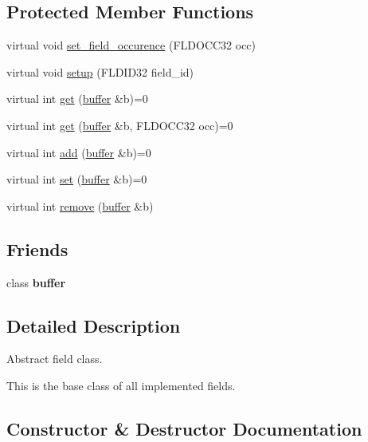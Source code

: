 \subsection*{Protected Member Functions}
\begin{DoxyCompactItemize}
\item 
virtual void \hyperlink{classatmi_1_1field_a83412cd9df383c342b5feb195090c9d9}{set\+\_\+field\+\_\+occurence} (F\+L\+D\+O\+C\+C32 occ)
\item 
virtual void \hyperlink{classatmi_1_1field_a9ca5e61e3e1068770098d20ad1332f24}{setup} (F\+L\+D\+I\+D32 field\+\_\+id)
\item 
virtual int \hyperlink{classatmi_1_1field_aae2d3df756e816b5db8f729039a59a51}{get} (\hyperlink{classatmi_1_1buffer}{buffer} \&b)=0
\item 
virtual int \hyperlink{classatmi_1_1field_a56ce53fabe290b94463f87936515ec46}{get} (\hyperlink{classatmi_1_1buffer}{buffer} \&b, F\+L\+D\+O\+C\+C32 occ)=0
\item 
virtual int \hyperlink{classatmi_1_1field_a5441bc87ba4bc3e9eb37c6db6a29688f}{add} (\hyperlink{classatmi_1_1buffer}{buffer} \&b)=0
\item 
virtual int \hyperlink{classatmi_1_1field_a41bb209965d627d2e67c839bece5372c}{set} (\hyperlink{classatmi_1_1buffer}{buffer} \&b)=0
\item 
virtual int \hyperlink{classatmi_1_1field_a783484fe641f66f5773f9eed7fd4be39}{remove} (\hyperlink{classatmi_1_1buffer}{buffer} \&b)
\end{DoxyCompactItemize}
\subsection*{Friends}
\begin{DoxyCompactItemize}
\item 
class {\bfseries buffer}\hypertarget{classatmi_1_1field_afecbc2840248040e50fecb7164f912a9}{}\label{classatmi_1_1field_afecbc2840248040e50fecb7164f912a9}

\end{DoxyCompactItemize}


\subsection{Detailed Description}
Abstract field class.

This is the base class of all implemented fields. 

\subsection{Constructor \& Destructor Documentation}

